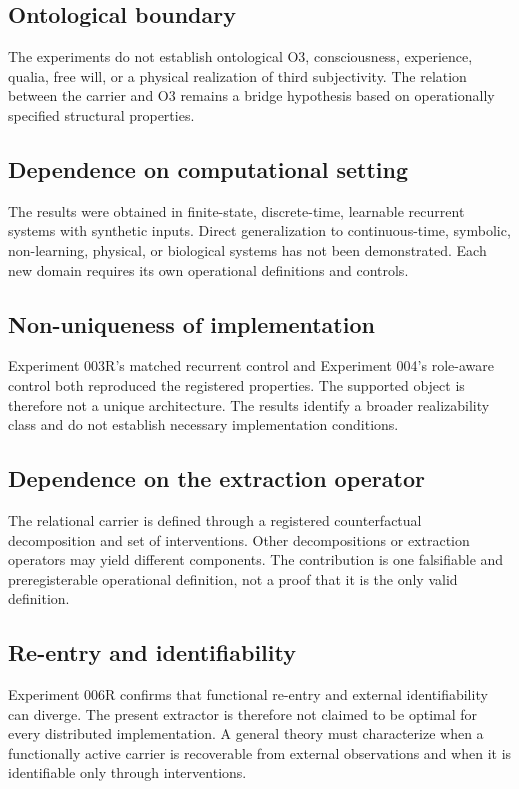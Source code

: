 \documentclass[11pt,a4paper]{article}
\begin{document}
\subsection{Ontological boundary}

The experiments do not establish ontological O3, consciousness, experience, qualia, free will, or a physical realization of third subjectivity. The relation between the carrier and O3 remains a bridge hypothesis based on operationally specified structural properties.

\subsection{Dependence on computational setting}

The results were obtained in finite-state, discrete-time, learnable recurrent systems with synthetic inputs. Direct generalization to continuous-time, symbolic, non-learning, physical, or biological systems has not been demonstrated. Each new domain requires its own operational definitions and controls.

\subsection{Non-uniqueness of implementation}

Experiment 003R's matched recurrent control and Experiment 004's role-aware control both reproduced the registered properties. The supported object is therefore not a unique architecture. The results identify a broader realizability class and do not establish necessary implementation conditions.

\subsection{Dependence on the extraction operator}

The relational carrier is defined through a registered counterfactual decomposition and set of interventions. Other decompositions or extraction operators may yield different components. The contribution is one falsifiable and preregisterable operational definition, not a proof that it is the only valid definition.

\subsection{Re-entry and identifiability}

Experiment 006R confirms that functional re-entry and external identifiability can diverge. The present extractor is therefore not claimed to be optimal for every distributed implementation. A general theory must characterize when a functionally active carrier is recoverable from external observations and when it is identifiable only through interventions.
\end{document}
